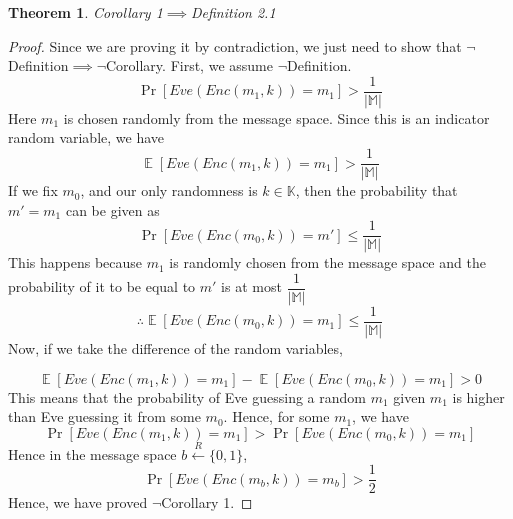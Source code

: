 \documentclass[14pt]{article}
\newtheorem{theorem}{Theorem}
\DeclareMathOperator{\EX}{\mathbb{E}}
\begin{document}
			\begin{theorem} 
				Corollary 1$\implies$Definition 2.1
			\end{theorem}
			\begin{proof}
				Since we are proving it by contradiction, we just need to show that $\neg$Definition$\implies$$\neg$Corollary. First, we assume $\neg$Definition.\\
				$$\Pr [Eve(Enc(m_1, k)) = m_1] > \dfrac{1}{|\mathbb{M}|}$$
				Here $m_1$ is chosen randomly from the message space. Since this is an indicator random variable, we have
				$$\EX[Eve(Enc(m_1, k)) = m_1] > \dfrac{1}{|\mathbb{M}|}$$
				If we fix $m_0$, and our only randomness is $k \in \mathbb{K}$, then the probability that $m' = m_1$ can be given as 
				$$\Pr [Eve(Enc(m_0, k)) = m'] \leq \dfrac{1}{|\mathbb{M}|}$$
				This happens because $m_1$ is randomly chosen from the message space and the probability of it to be equal to $m'$ is at most $\dfrac{1}{|\mathbb{M}|}$
				$$\therefore \EX [Eve(Enc(m_0, k)) = m_1] \leq \dfrac{1}{|\mathbb{M}|}$$
				Now, if we take the difference of the random variables,
				
				$$\EX[Eve(Enc(m_1, k)) = m_1] - \EX [Eve(Enc(m_0, k)) = m_1] > 0$$
				This means that the probability of Eve guessing a random $m_1$ given $m_1$ is higher than Eve guessing it from some $m_0$. Hence, for some $m_1$, we have
				$$\Pr[Eve(Enc(m_1, k)) = m_1] > \Pr [Eve(Enc(m_0, k)) = m_1]$$
				Hence in the message space $b \xleftarrow{R} \{0, 1\}$,
				$$\Pr[Eve(Enc(m_b, k)) = m_b] > \dfrac{1}{2}$$
				Hence, we have proved $\neg$Corollary 1.
				
			\end{proof}
 		
\end{document}

